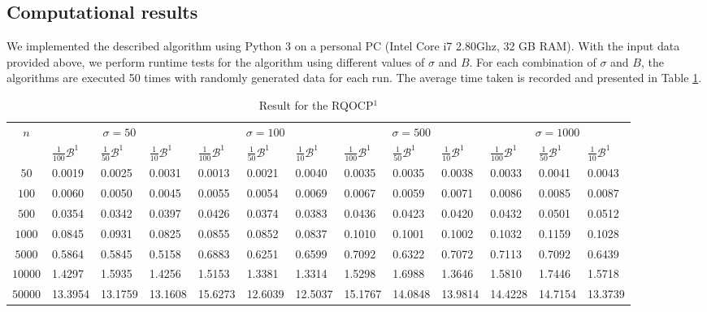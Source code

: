 \documentclass{article}
\theoremstyle{plain}
\begin{document}
\subsection*{Computational results}
We implemented the described algorithm using Python 3 on a personal PC (Intel Core i7 2.80Ghz, 32 GB RAM). With the input data provided above, we perform runtime tests for the algorithm using different values of $\sigma$ and $B$. For each combination of $\sigma$ and $B$, the algorithms are executed 50 times with randomly generated data for each run. The average time taken is recorded and presented in Table \ref{tab1}.
\begin{table}[H]
\small
\centering
\caption{Result for the RQOCP$^1$}
\label{tab1}
\begin{tabular}{|c|lll|lll|lll|lll|}
\hline
\multirow{2}{*}{$n$}  
 & \multicolumn{3}{c|}{$\sigma=50$} & \multicolumn{3}{c|}{$\sigma=100$} & \multicolumn{3}{c|}{$\sigma=500$} &\multicolumn{3}{c|}{$\sigma=1000$}\\
\cline{2-13}
 & $\frac{1}{100}\mathcal{B}^1$ & $\frac{1}{50} \mathcal{B}^1$ & $\frac{1}{10}\mathcal{B}^1$ & $\frac{1}{100}\mathcal{B}^1$& $\frac{1}{50} \mathcal{B}^1$ & $\frac{1}{10}\mathcal{B}^1$& $\frac{1}{100}\mathcal{B}^1$& $\frac{1}{50} \mathcal{B}^1$ & $\frac{1}{10}\mathcal{B}^1$& $\frac{1}{100}\mathcal{B}^1$& $\frac{1}{50} \mathcal{B}^1$ & $\frac{1}{10}\mathcal{B}^1$\\
\hline
$50$ & 0.0019 &  0.0025 & 0.0031 & 0.0013 &  0.0021 & 0.0040& 0.0035 &  0.0035 & 0.0038& 0.0033 &  0.0041 & 0.0043 \\
\hline
$100$ & 0.0060 &  0.0050 & 0.0045 & 0.0055 &  0.0054 & 0.0069& 0.0067 &  0.0059 & 0.0071& 0.0086 &  0.0085 & 0.0087 \\
\hline
$500$ & 0.0354 &  0.0342 & 0.0397 & 0.0426 &  0.0374 & 0.0383& 0.0436 &  0.0423 & 0.0420& 0.0432 &  0.0501 & 0.0512 \\
\hline
$1000$ & 0.0845 &  0.0931 & 0.0825 & 0.0855 &  0.0852 & 0.0837& 0.1010 &  0.1001 & 0.1002& 0.1032 &  0.1159 & 0.1028 \\
\hline
$5000$ & 0.5864 &  0.5845 & 0.5158 & 0.6883 &  0.6251 & 0.6599& 0.7092 &  0.6322 & 0.7072& 0.7113 &  0.7092 & 0.6439 \\
\hline
$10000$ & 1.4297 &  1.5935 & 1.4256 & 1.5153 &  1.3381 & 1.3314& 1.5298 &  1.6988 & 1.3646& 1.5810 &  1.7446 & 1.5718 \\
\hline
$50000$ & 13.3954 &  13.1759 & 13.1608 & 15.6273 &  12.6039 & 12.5037& 15.1767 &  14.0848 & 13.9814 & 14.4228 & 14.7154  & 13.3739 \\
\hline
\end{tabular}
\end{table}
\end{document}
